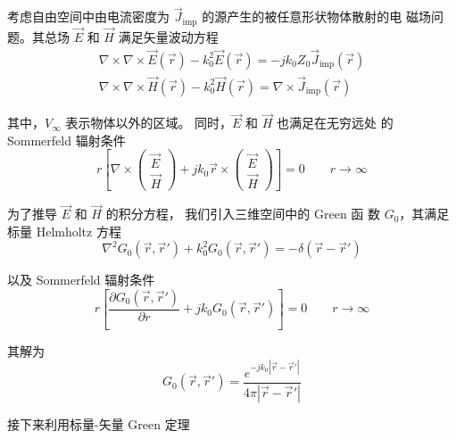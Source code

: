 \par 考虑自由空间中由电流密度为 $\vec{J}_{\text{imp}}$ 的源产生的被任意形状物体散射的电
磁场问题。其总场 $\vec{E}$ 和 $\vec{H}$ 满足矢量波动方程
\begin{gather}
    \label{矢量波动方程-1}
    \nabla \times \nabla \times \vec{E}(\vec{r}) - k_0^2 \vec{E}(\vec{r})
    = -jk_0Z_0 \vec{J}_{\text{imp}}(\vec{r}) \\
    \label{矢量波动方程-2}
    \nabla \times \nabla \times \vec{H}(\vec{r}) - k_0^2 \vec{H}(\vec{r})
    = \nabla \times \vec{J}_{\text{imp}}(\vec{r})
\end{gather}
\par 其中，$V_{\infty}$ 表示物体以外的区域。
同时，$\vec{E}$ 和 $\vec{H}$ 也满足在无穷远处
的 Sommerfeld 辐射条件
\begin{equation}
    r\left[
        \nabla \times
        \begin{pmatrix}
            \vec{E}\\
            \vec{H}
        \end{pmatrix}
        +jk_0\vec{r} \times
        \begin{pmatrix}
            \vec{E}\\
            \vec{H}
        \end{pmatrix}
    \right]=0
    \qquad
    r\rightarrow\infty
    \label{Sommerfeld 辐射条件}
\end{equation}
\par 为了推导 $\vec{E}$ 和 $\vec{H}$ 的积分方程，
我们引入三维空间中的 Green 函
数 $G_0$，其满足标量 Helmholtz 方程
\begin{equation}
    \label{三维空间中的 Green 函数方程}
    \nabla^2 G_0(\vec{r}, \vec{r}') + k_0^2 G_0(\vec{r}, \vec{r}') 
    = -\delta(\vec{r}-\vec{r}')
\end{equation}
\par 以及 Sommerfeld 辐射条件
\begin{equation}
    r \left[
        \frac{\partial G_0(\vec{r}, \vec{r}')}{\partial r}
        +j k_0 G_0(\vec{r}, \vec{r}')
    \right] = 0
    \qquad
    r \rightarrow \infty
    \label{Green 函数的 Sommerfeld 辐射条件}
\end{equation}
\par 其解为
\begin{equation}
    G_0(\vec{r}, \vec{r}') = 
    \frac{e^{-jk_0\left|\vec{r}-\vec{r}'\right|}}{4\pi\left|\vec{r}-\vec{r}'\right|}
\end{equation}
\par 接下来利用标量-矢量 Green 定理
